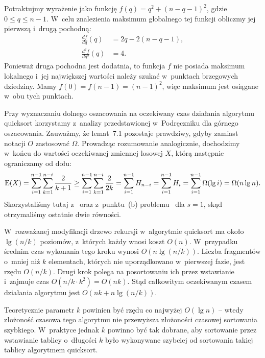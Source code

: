 \exercise %
Potraktujmy wyrażenie jako funkcję $f(q)=q^2+(n-q-1)^2$, gdzie $0\le q\le n-1$. W~celu znalezienia maksimum globalnego tej funkcji obliczmy jej pierwszą i~drugą pochodną:
\begin{align*}
    \frac{df}{dq}(q) &= 2q-2(n-q-1), \\
	\frac{d^2\!f}{dq^2}(q) &= 4.
\end{align*}
Ponieważ druga pochodna jest dodatnia, to funkcja $f$ nie posiada maksimum lokalnego i~jej największej wartości należy szukać w~punktach brzegowych dziedziny. Mamy $f(0)=f(n-1)=(n-1)^2$, więc maksimum jest osiągane w~obu tych punktach.

\exercise %
Przy wyznaczaniu dolnego oszacowania na oczekiwany czas działania algorytmu quicksort korzystamy z~analizy przedstawionej w~Podręczniku dla górnego oszacowania. Zauważmy, że lemat~7.1 pozostaje prawdziwy, gdyby zamiast notacji $O$ zastosować $\Omega$. Prowadząc rozumowanie analogicznie, dochodzimy w~końcu do wartości oczekiwanej zmiennej losowej $X$, którą następnie ograniczamy od dołu:
\[
	\operatorname{E}(X) = \sum_{i=1}^{n-1}\sum_{k=1}^{n-i}\frac{2}{k+1} \ge \sum_{i=1}^{n-1}\sum_{k=1}^{n-i}\frac{2}{2k} = \sum_{i=1}^{n-1}H_{n-i} = \sum_{i=1}^{n-1}H_i = \sum_{i=1}^{n-1}\Omega(\lg i) = \Omega(n\lg n).
\]
Skorzystaliśmy tutaj z~ oraz z~punktu~(b) problemu~ dla $s=1$, skąd otrzymaliśmy ostatnie dwie równości.

\exercise %
W~rozważanej modyfikacji drzewo rekursji w~algorytmie quicksort ma około $\lg(n/k)$ poziomów, z~których każdy wnosi koszt $O(n)$. W~przypadku średnim czas wykonania tego kroku wynosi $O(n\lg(n/k))$. Liczba fragmentów o~mniej niż $k$ elementach, których nie uporządkowano w~pierwszej fazie, jest rzędu $O(n/k)$. Drugi krok polega na posortowaniu ich przez wstawianie i~zajmuje czas $O(n/k\cdot k^2)=O(nk)$. Stąd całkowitym oczekiwanym czasem działania algorytmu jest $O(nk+n\lg(n/k))$.

Teoretycznie parametr $k$ powinien być rzędu co najwyżej $O(\lg n)$ -- wtedy złożoność czasowa tego algorytmu nie przewyższa złożoności czasowej sortowania szybkiego. W~praktyce jednak $k$ powinno być tak dobrane, aby sortowanie przez wstawianie tablicy o~długości $k$ było wykonywane szybciej od sortowania takiej tablicy algorytmem quicksort.

